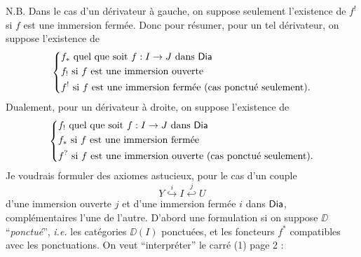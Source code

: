 N.B. Dans le cas d'un dérivateur à gauche, on suppose seulement l'existence de $f^!$ si $f$ est une immersion fermée. Donc pour résumer, pour un tel dérivateur, on suppose l'existence de
\[
\left\{
\begin{aligned}
& f_* \text{ quel que soit } f : I \to J \text{ dans } \mathsf{Dia} \\
& f_! \text{ si } f \text{ est une immersion ouverte} \\
& f^! \text{ si } f \text{ est une immersion fermée (cas ponctué seulement).}
\end{aligned}
\right.
\]
Dualement, pour un dérivateur à droite, on suppose l'existence de
\[
\left\{
\begin{aligned}
& f_! \text{ quel que soit } f : I \to J \text{ dans } \mathsf{Dia} \\
& f_* \text{ si } f \text{ est une immersion fermée} \\
& f^? \text{ si } f \text{ est une immersion ouverte (cas ponctué seulement).}
\end{aligned}
\right.
\]
Je voudrais formuler des axiomes astucieux, pour le cas d'un couple
\[ Y \overset{i}{\hookrightarrow} I \overset{j}{\hookleftarrow} U \]
d'une immersion ouverte $j$ et d'une immersion fermée $i$ dans $\mathsf{Dia}$, complémentaires l'une de l'autre. D'abord une formulation si on suppose $\DD$ “\textit{ponctué}”, \textit{i.e.} les catégories $\DD(I)$ ponctuées, et les foncteurs $f^*$ compatibles avec les ponctuations. On veut “interpréter” le carré (1) page 2 :


